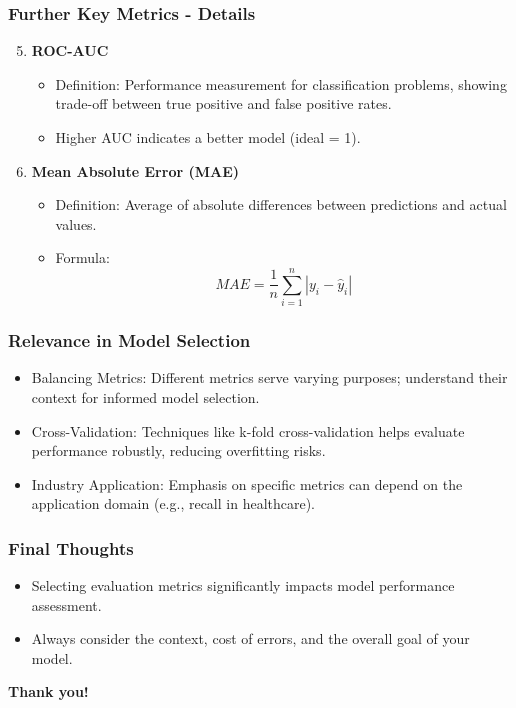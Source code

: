 \documentclass{beamer}
\begin{document}
\begin{frame}[fragile]
    \frametitle{Further Key Metrics - Details}
    \begin{enumerate}
        \setcounter{enumi}{4}
        \item \textbf{ROC-AUC}
            \begin{itemize}
                \item Definition: Performance measurement for classification problems, showing trade-off between true positive and false positive rates.
                \item Higher AUC indicates a better model (ideal = 1).
            \end{itemize}
        \item \textbf{Mean Absolute Error (MAE)}
            \begin{itemize}
                \item Definition: Average of absolute differences between predictions and actual values.
                \item Formula: 
                \[
                MAE = \frac{1}{n} \sum_{i=1}^{n} |y_i - \hat{y}_i|
                \]
            \end{itemize}
    \end{enumerate}
\end{frame}

\begin{frame}[fragile]
    \frametitle{Relevance in Model Selection}
    \begin{itemize}
        \item Balancing Metrics: Different metrics serve varying purposes; understand their context for informed model selection.
        \item Cross-Validation: Techniques like k-fold cross-validation helps evaluate performance robustly, reducing overfitting risks.
        \item Industry Application: Emphasis on specific metrics can depend on the application domain (e.g., recall in healthcare).
    \end{itemize}
\end{frame}

\begin{frame}[fragile]
    \frametitle{Final Thoughts}
    \begin{itemize}
        \item Selecting evaluation metrics significantly impacts model performance assessment.
        \item Always consider the context, cost of errors, and the overall goal of your model.
    \end{itemize}
    \textbf{Thank you!}
\end{frame}
\end{document}
